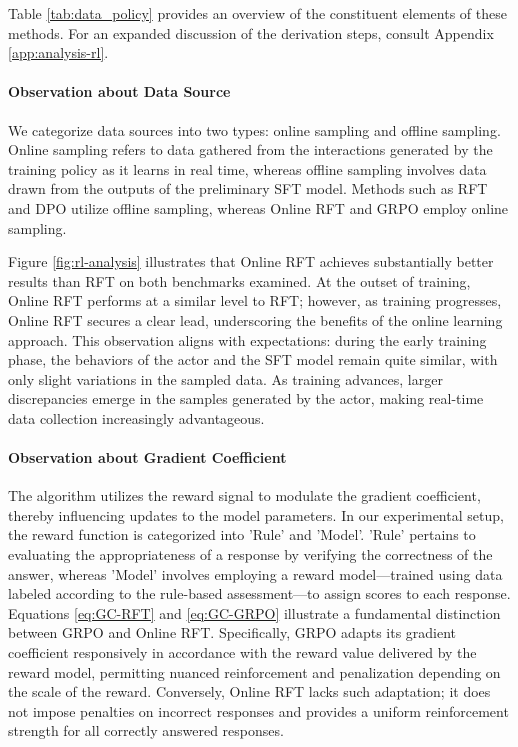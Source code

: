 \begin{itemize}[topsep=0pt]
\begin{itemize}[topsep=0pt]
Table \ref{tab:data_policy} provides an overview of the constituent elements of these methods. For an expanded discussion of the derivation steps, consult Appendix \ref{app:analysis-rl}.

\paragraph{Observation about Data Source} We categorize data sources into two types: online sampling and offline sampling. Online sampling refers to data gathered from the interactions generated by the training policy as it learns in real time, whereas offline sampling involves data drawn from the outputs of the preliminary SFT model. Methods such as RFT and DPO utilize offline sampling, whereas Online RFT and GRPO employ online sampling.

Figure \ref{fig:rl-analysis} illustrates that Online RFT achieves substantially better results than RFT on both benchmarks examined. At the outset of training, Online RFT performs at a similar level to RFT; however, as training progresses, Online RFT secures a clear lead, underscoring the benefits of the online learning approach. This observation aligns with expectations: during the early training phase, the behaviors of the actor and the SFT model remain quite similar, with only slight variations in the sampled data. As training advances, larger discrepancies emerge in the samples generated by the actor, making real-time data collection increasingly advantageous.

\paragraph{Observation about Gradient Coefficient} The algorithm utilizes the reward signal to modulate the gradient coefficient, thereby influencing updates to the model parameters. In our experimental setup, the reward function is categorized into 'Rule' and 'Model'. 'Rule' pertains to evaluating the appropriateness of a response by verifying the correctness of the answer, whereas 'Model' involves employing a reward model—trained using data labeled according to the rule-based assessment—to assign scores to each response. Equations \ref{eq:GC-RFT} and \ref{eq:GC-GRPO} illustrate a fundamental distinction between GRPO and Online RFT. Specifically, GRPO adapts its gradient coefficient responsively in accordance with the reward value delivered by the reward model, permitting nuanced reinforcement and penalization depending on the scale of the reward. Conversely, Online RFT lacks such adaptation; it does not impose penalties on incorrect responses and provides a uniform reinforcement strength for all correctly answered responses.


\end{itemize}
\end{itemize}
